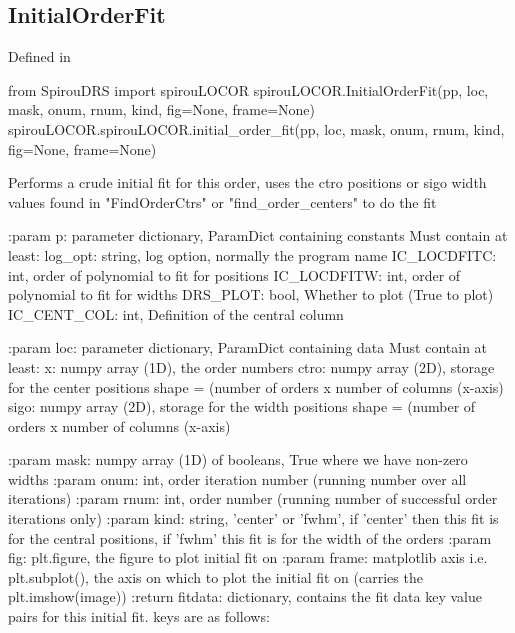 \noindent\begin{minipage}{\textwidth}
\subsection{InitialOrderFit}

Defined in \spirouLOCOR{}

\begin{pythonbox}
from SpirouDRS import spirouLOCOR
spirouLOCOR.InitialOrderFit(pp, loc, mask, onum, rnum, kind, fig=None, frame=None)
spirouLOCOR.spirouLOCOR.initial_order_fit(pp, loc, mask, onum, rnum, kind, fig=None, frame=None)
\end{pythonbox}

\begin{pythondocstring}
Performs a crude initial fit for this order, uses the ctro positions or sigo 
width values found in "FindOrderCtrs" or "find_order_centers" to do the fit

:param p: parameter dictionary, ParamDict containing constants
    Must contain at least:
            log_opt: string, log option, normally the program name
            IC_LOCDFITC: int, order of polynomial to fit for positions
            IC_LOCDFITW: int, order of polynomial to fit for widths
            DRS_PLOT: bool, Whether to plot (True to plot)
            IC_CENT_COL: int, Definition of the central column

:param loc: parameter dictionary, ParamDict containing data
        Must contain at least:
            x: numpy array (1D), the order numbers
            ctro: numpy array (2D), storage for the center positions
                  shape = (number of orders x number of columns (x-axis)
            sigo: numpy array (2D), storage for the width positions
                  shape = (number of orders x number of columns (x-axis)

:param mask: numpy array (1D) of booleans, True where we have non-zero
             widths
:param onum: int, order iteration number (running number over all
             iterations)
:param rnum: int, order number (running number of successful order
             iterations only)
:param kind: string, 'center' or 'fwhm', if 'center' then this fit is for
             the central positions, if 'fwhm' this fit is for the width of
             the orders
:param fig: plt.figure, the figure to plot initial fit on
:param frame: matplotlib axis i.e. plt.subplot(), the axis on which to plot
              the initial fit on (carries the plt.imshow(image))
:return fitdata: dictionary, contains the fit data key value pairs for this
                 initial fit. keys are as follows:


\end{pythondocstring}
\end{minipage}
